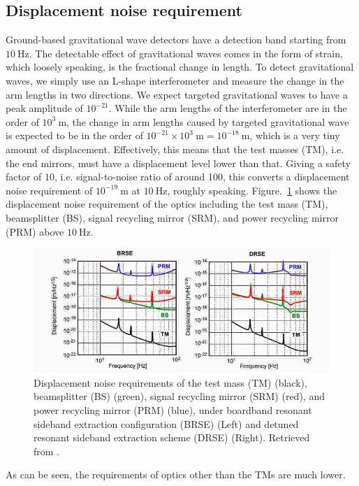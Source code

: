 \subsection{Displacement noise requirement \label{sec:displacement_noise_requirement}}
Ground-based gravitational wave detectors have a detection band starting from $10~\mathrm{Hz}$.
The detectable effect of gravitational waves comes in the form of strain, which loosely speaking, is the fractional change in length.
To detect gravitational waves, we simply use an L-shape interferometer and measure the change in the arm lengths in two directions.
We expect targeted gravitational waves to have a peak amplitude of $10^{-21}$.
While the arm lengths of the interferometer are in the order of $10^{3}~\mathrm{m}$, the change in arm lengths caused by targeted gravitational wave is expected to be in the order of $10^{-21}\times 10^{3}~\mathrm{m}=10^{-18}~\mathrm{m}$, which is a very tiny amount of displacement.
Effectively, this means that the test masses (TM), i.e. the end mirrors, must have a displacement level lower than that.
Giving a safety factor of $10$, i.e. signal-to-noise ratio of around 100, this converts a displacement noise requirement of $10^{-19}~\mathrm{m}$ at $10~\mathrm{Hz}$, roughly speaking. Figure.~\ref{fig:displacementnoiserequirement} shows the displacement noise requirement of the optics including the test mass (TM), beamsplitter (BS), signal recycling mirror (SRM), and power recycling mirror (PRM) above $10~\mathrm{Hz}$.
\begin{figure}[!h]
	\centering
	\includegraphics[width=0.7\linewidth]{figures/displacement_noise_requirement}
	\caption{Displacement noise requirements of the test mass (TM) (black), beamsplitter (BS) (green), signal recycling mirror (SRM) (red), and power recycling mirror (PRM) (blue), under boardband resonant sideband extraction configuration (BRSE) (Left) and detuned resonant sideband extraction scheme (DRSE) (Right). Retrieved from \cite{Sekiguchi:2016bmv}.}
	\label{fig:displacementnoiserequirement}
\end{figure}
As can be seen, the requirements of optics other than the TMs are much lower.
